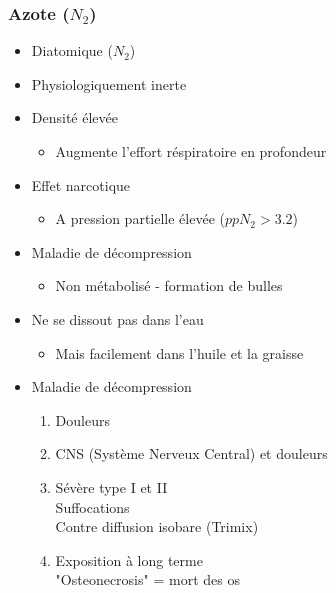 \documentclass[aspectratio=1610,english,12pt]{beamer}
\begin{document}
\subsubsection{Azote ($N_2$)}
\begin{frame}{\insertsubsubsection}
	\begin{itemize}
		\item Diatomique ($N_2$)
		\item Physiologiquement inerte
		\item Densité élevée
		\begin{itemize}\item Augmente l'effort réspiratoire en profondeur\end{itemize}
		\item Effet narcotique
		\begin{itemize}\item A pression partielle élevée ($ppN_2 > 3.2$)\end{itemize}
		\item Maladie de décompression
		\begin{itemize}\item Non métabolisé - formation de bulles\end{itemize}
		\item Ne se dissout pas dans l'eau
		\begin{itemize}\item Mais facilement dans l'huile et la graisse\end{itemize}
	\end{itemize}
\end{frame}

\begin{frame}{\insertsubsubsection}
	\begin{itemize}
		\item Maladie de décompression
		\begin{enumerate}[I]
			\item Douleurs
			\item CNS (Système Nerveux Central) et douleurs
			\item Sévère type I et II \\ Suffocations \\ Contre diffusion isobare (Trimix)
			\item Exposition à long terme \\ "Osteonecrosis" = mort des os
		\end{enumerate}
	\end{itemize}
\end{frame}
\end{document}
